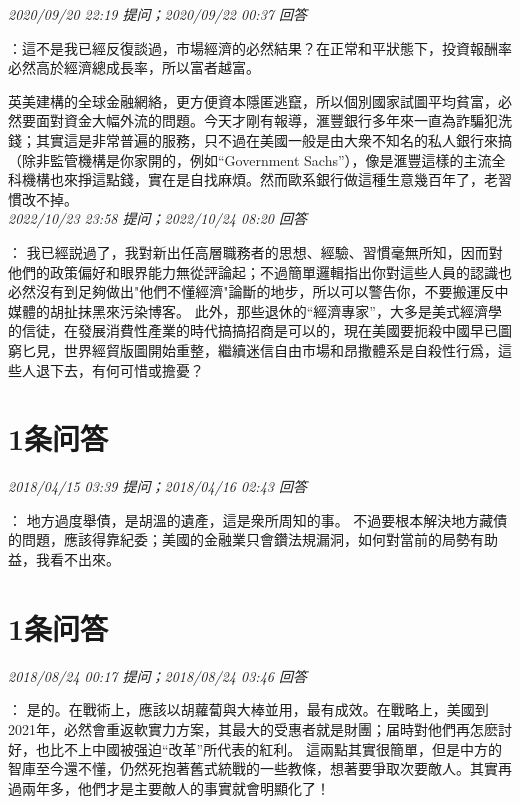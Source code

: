 \documentclass[twocolumn]{ctexart}
\begin{document}
\textit{\hfill\noindent\small 2020/09/20 22:19 提问；2020/09/22 00:37 回答}

：這不是我已經反復談過，市場經濟的必然結果？在正常和平狀態下，投資報酬率必然高於經濟總成長率，所以富者越富。

英美建構的全球金融網絡，更方便資本隱匿逃竄，所以個別國家試圖平均貧富，必然要面對資金大幅外流的問題。今天才剛有報導，滙豐銀行多年來一直為詐騙犯洗錢；其實這是非常普遍的服務，只不過在美國一般是由大衆不知名的私人銀行來搞（除非監管機構是你家開的，例如“Government Sachs”），像是滙豐這樣的主流全科機構也來掙這點錢，實在是自找麻煩。然而歐系銀行做這種生意幾百年了，老習慣改不掉。
\\

\textit{\hfill\noindent\small 2022/10/23 23:58 提问；2022/10/24 08:20 回答}

：
我已經説過了，我對新出任高層職務者的思想、經驗、習慣毫無所知，因而對他們的政策偏好和眼界能力無從評論起；不過簡單邏輯指出你對這些人員的認識也必然沒有到足夠做出"他們不懂經濟"論斷的地步，所以可以警告你，不要搬運反中媒體的胡扯抹黑來污染博客。
此外，那些退休的“經濟專家”，大多是美式經濟學的信徒，在發展消費性產業的時代搞搞招商是可以的，現在美國要扼殺中國早已圖窮匕見，世界經貿版圖開始重整，繼續迷信自由市場和昂撒體系是自殺性行爲，這些人退下去，有何可惜或擔憂？
\\

\section{1条问答}

\textit{\hfill\noindent\small 2018/04/15 03:39 提问；2018/04/16 02:43 回答}

：
地方過度舉債，是胡溫的遺產，這是衆所周知的事。
不過要根本解決地方藏債的問題，應該得靠紀委；美國的金融業只會鑽法規漏洞，如何對當前的局勢有助益，我看不出來。
\\

\section{1条问答}

\textit{\hfill\noindent\small 2018/08/24 00:17 提问；2018/08/24 03:46 回答}

：
是的。在戰術上，應該以胡蘿蔔與大棒並用，最有成效。在戰略上，美國到2021年，必然會重返軟實力方案，其最大的受惠者就是財團；届時對他們再怎麽討好，也比不上中國被强迫“改革”所代表的紅利。
這兩點其實很簡單，但是中方的智庫至今還不懂，仍然死抱著舊式統戰的一些教條，想著要爭取次要敵人。其實再過兩年多，他們才是主要敵人的事實就會明顯化了！
\\
\end{document}

